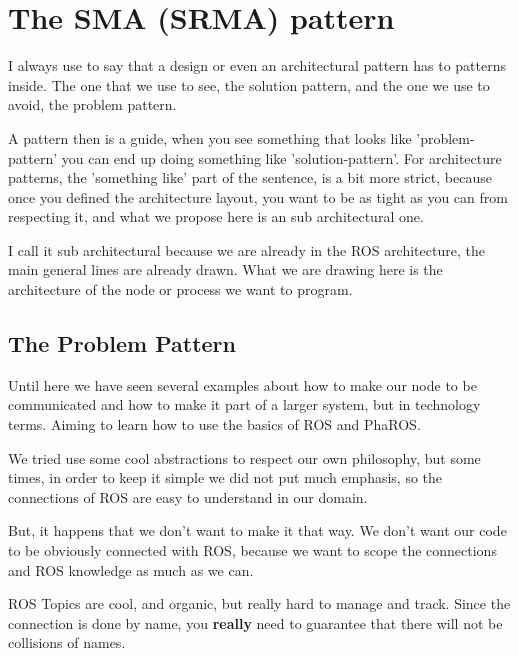 \documentclass[a4paper,10pt,twoside]{book}
\begin{document}
\fi
\sloppy
\chapter { The SMA (SRMA) pattern }
					
					I always use to say that a design or even an architectural pattern has to patterns inside. The one that we use to see, the solution pattern, and the one we use to avoid, the problem pattern. 
					
					A pattern then is a guide, when you see something that looks like 'problem-pattern' you can end up doing something like 'solution-pattern'. 
					For architecture patterns, the 'something like' part of the sentence, is a bit more strict, because once you defined the architecture layout, you want to be as tight as you can from respecting it, and what we propose here is an sub architectural one. 
					
					I call it sub architectural because we are already in the ROS architecture, the main general lines are already drawn. What we are drawing here is the architecture of the node or process we want to program.
					
					
					\section {The Problem Pattern} 
					
					Until here we have seen several examples about how to make our node to be communicated and how to make it part of a larger system, but in technology terms. Aiming to learn how to use the basics of ROS and PhaROS.
					
					We tried use some cool abstractions to respect our own philosophy, but some times, in order to keep it simple we did not put much emphasis, so the connections of ROS are easy to understand in our domain. 
					
					But, it happens that we don't want to make it that way. We don't want our code to be obviously connected with ROS, because we want to scope the connections and ROS knowledge as much as we can.
					
					ROS Topics are cool, and organic, but really hard to manage and track. Since the connection is done by name, you \textbf{really} need to guarantee that there will not be collisions of names. 
					
\end{document}
